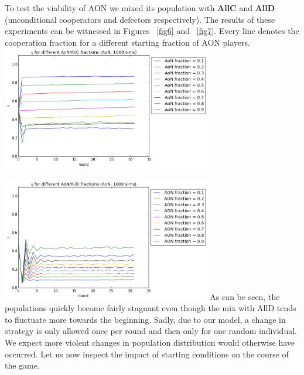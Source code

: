 \documentclass[letterpaper]{article}
\begin{document}
To test the viability of AON we mixed its population with \textbf{AllC} and \textbf{AllD} (unconditional cooperators and defectors respectively). The results of these experiments can be witnessed in Figures ~\ref{fig6} and ~\ref{fig7}. Every line denotes the cooperation fraction for a different starting fraction of AON players. 
\includegraphics[width=3.6in,angle=0]{img/cfraction_AONAllCfractions_aon.png}
\label{fig6}
\vspace{5 mm}

\includegraphics[width=3.6in,angle=0]{img/cfraction_AONAllDfractions_aon.png}
\label{fig7}
\vspace{5 mm}
As can be seen, the populations quickly become fairly stagnant even though the mix with AllD tends to fluctuate more towards the beginning. Sadly, due to our model, a change in strategy is only allowed once per round and then only for one random individual. We expect more violent changes in population distribution would otherwise have occurred.
Let us now inspect the impact of starting conditions on the course of the game.
\end{document}
